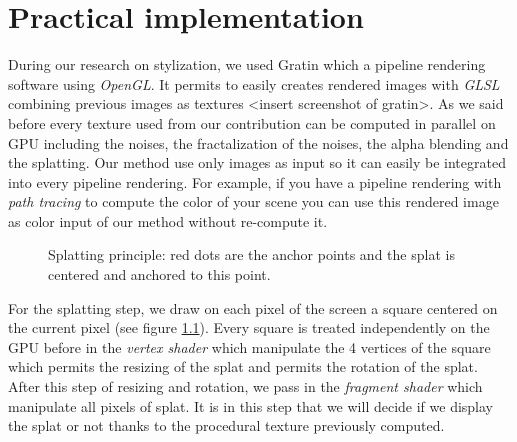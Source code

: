 \chapter{Practical implementation}




During our research on stylization, we used Gratin \cite{vergne:hal-01254546} which a pipeline rendering software using \textit{OpenGL}. It permits to easily creates rendered images with \textit{GLSL} combining previous images as textures <insert screenshot of gratin>. As we said before every texture used from our contribution can be computed in parallel on GPU including the noises, the fractalization of the noises, the alpha blending and the splatting. Our method use only images as input so it can easily be integrated into every pipeline rendering. For example, if you have a pipeline rendering with \textit{path tracing} to compute the color of your scene you can use this rendered image as color input of our method without re-compute it.\newline

\begin{figure}
    \begin{center}
    \end{center}
    \caption{Splatting principle: red dots are the anchor points and the splat is centered and anchored to this point.}
    \label{splatting_principle}
\end{figure}

For the splatting step, we draw on each pixel of the screen a square centered on the current pixel (see figure \ref{splatting_principle}). Every square is treated independently on the GPU before in the \textit{vertex shader} which manipulate the 4 vertices of the square which permits the resizing of the splat and permits the rotation of the splat. After this step of resizing and rotation, we pass in the \textit{fragment shader} which manipulate all pixels of splat. It is in this step that we will decide if we display the splat or not thanks to the procedural texture previously computed. \newline


